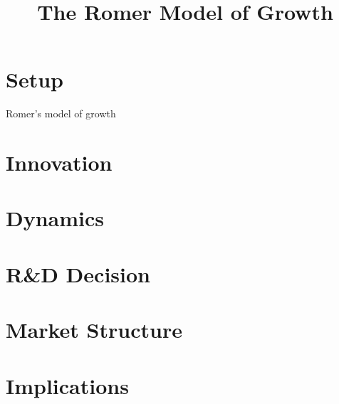 

\title[Romer]{The Romer Model of Growth}


\maketitle

\section{Setup}
\begin{frame}{Romer's model of growth}

\end{frame}

\section{Innovation}

\section{Dynamics}

\section{R\&D Decision}

\section{Market Structure}

\section{Implications}

